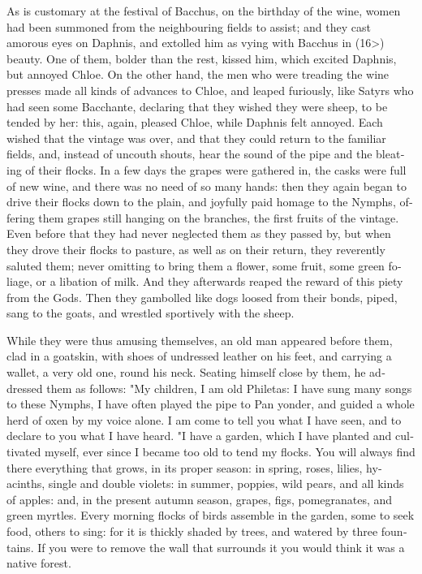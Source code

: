 \documentclass{book}
\begin{document}
\begin{pairs}
\begin{Rightside}
\begin{english}
  As is customary at the festival of Bacchus, on the birthday of the wine, women had been summoned from the neighbouring fields to assist; and they cast amorous eyes on Daphnis, and extolled him as vying with Bacchus in (16>) beauty.  One of them, bolder than the rest, kissed him, which excited Daphnis, but annoyed Chloe.  On the other hand, the men who were treading the wine presses made all kinds of advances to Chloe, and leaped furiously, like Satyrs who had seen some Bacchante, declaring that they wished they were sheep, to be tended by her: this, again, pleased Chloe, while Daphnis felt annoyed.  Each wished that the vintage was over, and that they could return to the familiar fields, and, instead of uncouth shouts, hear the sound of the pipe and the bleating of their flocks.  In a few days the grapes were gathered in, the casks were full of new wine, and there was no need of so many hands: then they again began to drive their flocks down to the plain, and joyfully paid homage to the Nymphs, offering them grapes still hanging on the branches, the first fruits of  the vintage.  Even before that they had never neglected them as they passed by, but when they drove their flocks to pasture, as well as on their return, they reverently saluted them; never omitting to bring them a flower, some fruit, some green foliage, or a libation of milk.  And they afterwards reaped the reward of this piety from the Gods.  Then they gambolled like dogs loosed from their bonds, piped, sang to the goats, and wrestled sportively with the sheep.
\pend


  While they were thus amusing themselves, an old man appeared before them, clad in a goatskin, with shoes of undressed leather on his feet, and carrying a wallet, a very old one, round his neck.  Seating himself close by them, he addressed them as follows: "My children, I am old Philetas: I have sung many songs to these Nymphs, I have often played the pipe to Pan yonder, and guided a whole herd of oxen by my voice alone.  I am come to tell you what I have seen, and to declare to you what I have heard.  "I have a garden, which I have planted and cultivated myself, ever since I became too old to tend my flocks.  You will always find there everything that grows, in its proper season: in spring, roses, lilies, hyacinths, single and double violets: in summer, poppies, wild pears, and all kinds of apples: and, in the present autumn season, grapes, figs, pomegranates, and green myrtles.  Every morning flocks of birds assemble in the garden, some to seek food, others to sing: for it is thickly shaded by trees, and watered by three fountains.  If you were to remove the wall that surrounds it you would think it was a native forest.
\pend



\end{english}
\end{Rightside}
\end{pairs}
\end{document}

